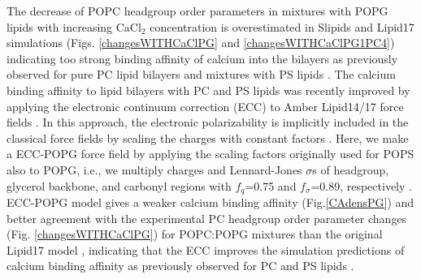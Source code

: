 \documentclass[aps,prl,superscriptaddress,twocolumn]{revtex4}
\begin{document}
The decrease of POPC headgroup order parameters in mixtures with POPG lipids with
increasing CaCl$_2$ concentration is overestimated in Slipids and Lipid17
simulations (Figs. \ref{changesWITHCaClPG} and \ref{changesWITHCaClPG1PC4})
indicating too strong binding affinity of calcium into the bilayers as previously
observed for pure PC lipid bilayers and mixtures with PS lipids \cite{catte16,antila19}.
The calcium binding affinity to lipid bilayers with PC and PS lipids
was recently improved by applying the electronic continuum correction (ECC) to Amber Lipid14/17 force fields \cite{melcr18,melcr20}.
In this approach, the electronic polarizability is implicitly included in the classical force fields
by scaling the charges with constant factors \cite{leontyev11}. Here, we make a ECC-POPG force field
by applying the scaling factors originally used for POPS also to POPG, i.e., we multiply
charges and Lennard-Jones $\sigma$s of headgroup, glycerol backbone, and carbonyl regions with 
$f_q$=0.75 and $f_\sigma$=0.89, respectively \cite{melcr20}.
ECC-POPG model gives a weaker calcium binding affinity (Fig.\ref{CAdensPG}) and better agreement with the experimental
PC headgroup order parameter changes (Fig. \ref{changesWITHCaClPG}) for POPC:POPG mixtures than the original Lipid17 model
, indicating that the ECC improves the simulation predictions of
calcium binding affinity as previously observed for PC and PS lipids \cite{melcr18,melcr20}.
\end{document}

